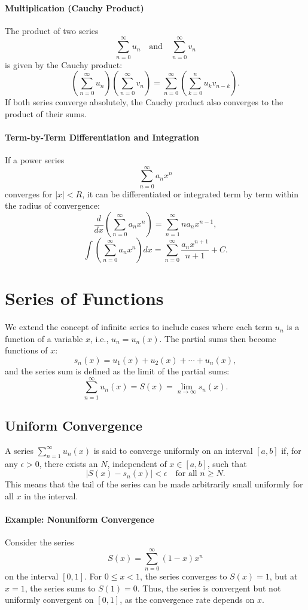 \documentclass[12pt]{article}
\begin{document}
\paragraph{Multiplication (Cauchy Product)}
The product of two series 
\[
\sum_{n=0}^\infty u_n \quad \text{and} \quad \sum_{n=0}^\infty v_n
\]
is given by the Cauchy product:
\[
\left( \sum_{n=0}^\infty u_n \right) \left( \sum_{n=0}^\infty v_n \right) = \sum_{n=0}^\infty \left( \sum_{k=0}^n u_k v_{n-k} \right).
\]
If both series converge absolutely, the Cauchy product also converges to the product of their sums.

\paragraph{Term-by-Term Differentiation and Integration}
If a power series 
\[
\sum_{n=0}^\infty a_n x^n
\]
converges for \(|x| < R\), it can be differentiated or integrated term by term within the radius of convergence:
\[
\frac{d}{dx} \left( \sum_{n=0}^\infty a_n x^n \right) = \sum_{n=1}^\infty n a_n x^{n-1},
\]
\[
\int \left( \sum_{n=0}^\infty a_n x^n \right) dx = \sum_{n=0}^\infty \frac{a_n x^{n+1}}{n+1} + C.
\]
\newpage

\section{Series of Functions}

We extend the concept of infinite series to include cases where each term \(u_n\) is a function of a variable \(x\), i.e., \(u_n = u_n(x)\). The partial sums then become functions of \(x\):
\[
s_n(x) = u_1(x) + u_2(x) + \cdots + u_n(x),
\]
and the series sum is defined as the limit of the partial sums:
\[
\sum_{n=1}^\infty u_n(x) = S(x) = \lim_{n \to \infty} s_n(x).
\]

\subsection{Uniform Convergence}
A series \(\sum_{n=1}^\infty u_n(x)\) is said to converge uniformly on an interval \([a, b]\) if, for any \(\epsilon > 0\), there exists an \(N\), independent of \(x \in [a, b]\), such that
\[
|S(x) - s_n(x)| < \epsilon \quad \text{for all } n \geq N.
\]
This means that the tail of the series can be made arbitrarily small uniformly for all \(x\) in the interval.

\paragraph{Example: Nonuniform Convergence}
Consider the series
\[
S(x) = \sum_{n=0}^\infty (1 - x)x^n
\]
on the interval \([0, 1]\). For \(0 \leq x < 1\), the series converges to \(S(x) = 1\), but at \(x = 1\), the series sums to \(S(1) = 0\). Thus, the series is convergent but not uniformly convergent on \([0, 1]\), as the convergence rate depends on \(x\).
\end{document}
